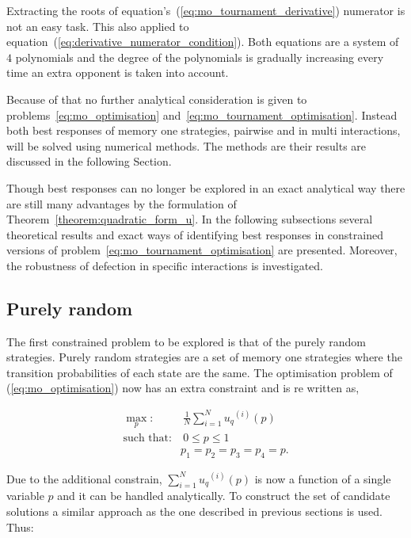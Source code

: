 \documentclass[10pt]{article}
\begin{document}
Extracting the roots of equation's~(\ref{eq:mo_tournament_derivative}) numerator
is not an easy task. This also applied to equation~(\ref{eq:derivative_numerator_condition}).
Both equations are a system of \(4\) polynomials and the degree of the polynomials
is gradually increasing every time an extra opponent is taken into account.

Because of that no further analytical consideration is given to problems~\ref{eq:mo_optimisation}
and~\ref{eq:mo_tournament_optimisation}. Instead both best responses of memory one
strategies, pairwise and in multi interactions, will be solved using numerical
methods. The methods are their results are discussed in the following Section.

Though best responses can no longer be explored in an exact analytical way
there are still many advantages by the formulation of Theorem~\ref{theorem:quadratic_form_u}.
In the following subsections several theoretical results and exact ways of identifying
best responses in constrained versions of problem~\ref{eq:mo_tournament_optimisation} are presented.
Moreover, the robustness of defection in specific interactions is investigated.

\subsection{Purely random}\label{section:purely_analytical}

The first constrained problem to be explored is that of the purely random strategies.
Purely random strategies are a set of memory one strategies where the transition
probabilities of each state are the same. The optimisation problem of (\ref{eq:mo_optimisation})
now has an extra constraint and is re written as,

\begin{equation}\label{eq:random_optimisation}
\begin{aligned}
\max_p: & \ \frac{1}{N} \sum_{i=1} ^ {N} {u_q}^{(i)} (p) 
\\
\text{such that}: & \ 0 \leq p \leq 1 \\
                  & p_1 = p_2 = p_3 = p_4 = p.
\end{aligned}
\end{equation}

Due to the additional constrain, \(\sum\limits_{i=1} ^ {N} {u_q}^{(i)} (p) \) is now a function of a single
variable \(p\) and it can be handled analytically. To construct the set of candidate
solutions a similar approach as the one described in previous sections is used. Thus:
\end{document}
